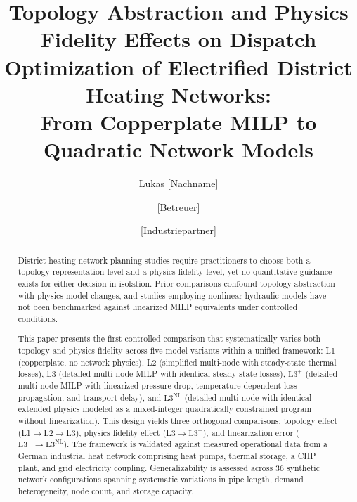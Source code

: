 \documentclass[review,3p]{elsarticle}
\newcommand{\Lplus}{\mathrm{L3}^{+}}
\newcommand{\Lnl}{\mathrm{L3}^{\mathrm{NL}}}
\begin{document}
\begin{frontmatter}

\title{Topology Abstraction and Physics Fidelity Effects on Dispatch
Optimization of Electrified District Heating Networks:\\
From Copperplate MILP to Quadratic Network Models}

\author[tum]{Lukas [Nachname]}
\author[tum]{[Betreuer]}
\author[partner]{[Industriepartner]}


\address[tum]{Lehrstuhl für Energiewirtschaft und Anwendungstechnik,
  Technische Universität München, München, Germany}

\address[partner]{[Industriepartner Institution], [Stadt], Austria}

\begin{abstract}
District heating network planning studies require practitioners to
choose both a topology representation level and a physics fidelity
level, yet no quantitative guidance exists for either decision in
isolation. Prior comparisons confound topology abstraction with
physics model changes, and studies employing nonlinear hydraulic
models have not been benchmarked against linearized MILP equivalents
under controlled conditions.

This paper presents the first controlled comparison that
systematically varies both topology and physics fidelity across five
model variants within a unified framework: L1 (copperplate, no
network physics), L2 (simplified multi-node with steady-state thermal
losses), L3 (detailed multi-node MILP with identical steady-state
losses), $\Lplus$ (detailed multi-node MILP with linearized pressure
drop, temperature-dependent loss propagation, and transport delay),
and $\Lnl$ (detailed multi-node with identical extended physics
modeled as a mixed-integer quadratically constrained program without
linearization). This design yields three orthogonal comparisons:
topology effect (L1$\to$L2$\to$L3), physics fidelity effect
(L3$\to\Lplus$), and linearization error ($\Lplus\to\Lnl$). The
framework is validated against measured operational data from a
German industrial heat network comprising heat pumps, thermal
storage, a CHP plant, and grid electricity coupling.
Generalizability is assessed across 36 synthetic network
configurations spanning systematic variations in pipe length, demand
heterogeneity, node count, and storage capacity.


\end{abstract}
\end{frontmatter}
\end{document}
